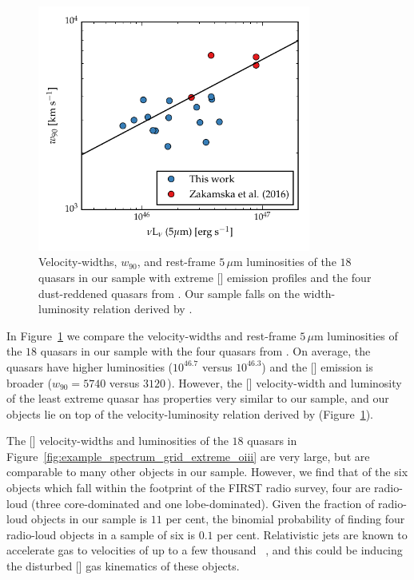 \begin{figure}
\centering 
    \includegraphics[width=0.8\textwidth]{figures/chapter04/fivemicron_w90.pdf} 
    \caption[{Velocity-widths and rest-frame $5$\,$\mu$m luminosities of the $18$ quasars in sample with extreme [] emission profiles and the four dust-reddened quasars from \citet{zakamska16}.}]{Velocity-widths, $w_{90}$, and rest-frame $5$\,$\mu$m luminosities of the $18$ quasars in our sample with extreme [] emission profiles and the four dust-reddened quasars from \citet{zakamska16}. Our sample falls on the width-luminosity relation derived by \citet{zakamska16}.}     
    \label{fig:fivemicron_w90}
\end{figure}

In Figure~\ref{fig:fivemicron_w90} we compare the velocity-widths and rest-frame $5$\,$\mu$m luminosities of the $18$ quasars in our sample with the four quasars from \citet{zakamska16}.
On average, the \citet{zakamska16} quasars have higher luminosities ($10^{46.7}$ versus $10^{46.3}$\ergs) and the [] emission is broader ($w_{90}=5740$ versus $3120$\,\kms).
However, the [] velocity-width and luminosity of the least extreme \citet{zakamska16} quasar has properties very similar to our sample, and our objects lie on top of the velocity-luminosity relation derived by \citet{zakamska16} (Figure~\ref{fig:fivemicron_w90}).

The [] velocity-widths and luminosities of the $18$ quasars in Figure~\ref{fig:example_spectrum_grid_extreme_oiii} are very large, but are comparable to many other objects in our sample.
However, we find that of the six objects which fall within the footprint of the FIRST radio survey, four are radio-loud (three core-dominated and one lobe-dominated).
Given the fraction of radio-loud objects in our sample is $11$ per cent, the binomial probability of finding four radio-loud objects in a sample of six is $0.1$ per cent. 
Relativistic jets are known to accelerate gas to velocities of up to a few thousand \kms\, \citep[e.g.][]{nesvadba06,nesvadba08}, and this could be inducing the disturbed [] gas kinematics of these objects. 

